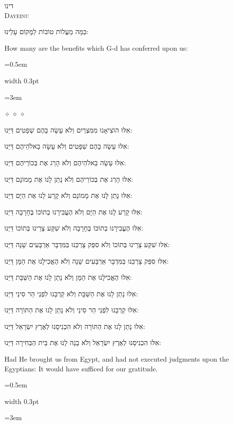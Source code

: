 \documentclass[11pt, openany]{book}
\newlength{\bidiHebWidth}
\newlength{\bidiEngWidth}
\newenvironment{bilingual}{%
  \par\vspace{4pt}%
}{%
  \noindent
  \begin{minipage}[t]{\bidiEngWidth}
    \setstretch{1.4}\emergencystretch=0.5em\normalsize
    \usebox{\bidiEngBox}
  \end{minipage}%
  \hfill
  {\color{sedergold}\vrule width 0.3pt}%
  \hfill
  \begin{minipage}[t]{\bidiHebWidth}
    \begingroup\hebrewfont\TeXXeTstate=1\beginR
    \large\setstretch{1.4}\emergencystretch=3em\tolerance=9999\parindent=0pt\relax
    \usebox{\bidiHebBox}
    \endR\endgroup
  \end{minipage}%
  \par\vspace{2pt}%
}
\newenvironment{hebrewcol}{%
  \begin{lrbox}{\bidiHebBox}\begin{minipage}{\bidiHebWidth}%
}{%
  \end{minipage}\end{lrbox}%
}
\newenvironment{englishcol}{%
  \begin{lrbox}{\bidiEngBox}\begin{minipage}{\bidiEngWidth}%
}{%
  \end{minipage}\end{lrbox}%
}
\newcommand{\parasep}{%
  \par\vspace{3pt}
  \begin{center}
    \textcolor{sedergold!50}{\tiny$\diamond\;\diamond\;\diamond$}
  \end{center}
  \par\vspace{3pt}
}
\newcommand{\subsedertitle}[2]{%
  \par\vspace{8pt}
  \begin{center}
    {\hebrewfontlarge\TeXXeTstate=1\beginR\textcolor{sederblue}{#1}\endR}\\[3pt]
    {\normalsize\scshape\textcolor{sederblue}{#2}}
  \end{center}
  \par\vspace{3pt}
}
\begin{document}
\subsedertitle{דינו}{Dayeinu}


\begin{bilingual}
\begin{hebrewcol}
כַּמָּה מַעֲלוֹת טוֹבוֹת לַמָּקוֹם עָלֵינוּ:
\end{hebrewcol}
\begin{englishcol}
How many are the benefits which G-d has conferred upon us:
\end{englishcol}
\end{bilingual}
\parasep

\begin{bilingual}
\begin{hebrewcol}
אִלּוּ הוֹצִיאָנוּ מִמִּצְרַיִם וְלֹא עָשָׂה בָהֶם שְׁפָטִים דַּיֵּנוּ:

אִלּוּ עָשָׂה בָהֶם שְׁפָטִים וְלֹא עָשָׂה בֵאלֹהֵיהֶם דַּיֵּנוּ:

אִלּוּ עָשָׂה בֵאלֹהֵיהֶם וְלֹא הָרַג אֶת בְּכוֹרֵיהֶם דַּיֵּנוּ:

אִלּוּ הָרַג אֶת בְּכוֹרֵיהֶם וְלֹא נָתַן לָנוּ אֶת מָמוֹנָם דַּיֵּנוּ:

אִלּוּ נָתַן לָנוּ אֶת מָמוֹנָם וְלֹא קָרַע לָנוּ אֶת הַיָּם דַּיֵּנוּ:

אִלּוּ קָרַע לָנוּ אֶת הַיָּם וְלֹא הֶעֱבִירָנוּ בְתוֹכוֹ בֶּחָרָבָה דַּיֵּנוּ:

אִלּוּ הֶעֱבִירָנוּ בְתוֹכוֹ בֶּחָרָבָה וְלֹא שִׁקַּע צָרֵינוּ בְּתוֹכוֹ דַּיֵּנוּ:

אִלּוּ שִׁקַּע צָרֵינוּ בְּתוֹכוֹ וְלֹא סִפֵּק צָרְכֵּנוּ בַּמִּדְבָּר אַרְבָּעִים שָׁנָה			 דַּיֵּנוּ:

אִלּוּ סִפֵּק צָרְכֵּנוּ בַּמִּדְבָּר אַרְבָּעִים שָׁנָה וְלֹא הֶאֱכִילָנוּ אֶת הַמָּן			 דַּיֵּנוּ:

אִלּוּ הֶאֱכִילָנוּ אֶת הַמָּן וְלֹא נָתַן לָנוּ אֶת הַשַּׁבָּת דַּיֵּנוּ:

אִלּוּ נָתַן לָנוּ אֶת הַשַּׁבָּת וְלֹא קֵרְבָנוּ לִפְנֵי הַר סִינַי דַּיֵּנוּ:

אִלּוּ קֵרְבָנוּ לִפְנֵי הַר סִינַי וְלֹא נָתַן לָנוּ אֶת הַתּוֹרָה דַּיֵּנוּ:

אִלּוּ נָתַן לָנוּ אֶת הַתּוֹרָה וְלֹא הִכְנִיסָנוּ לְאֶרֶץ יִשְׂרָאֵל דַּיֵּנוּ:

אִלּוּ הִכְנִיסָנוּ לְאֶרֶץ יִשְׂרָאֵל וְלֹא בָנָה לָנוּ אֶת בֵּית הַבְּחִירָה			 דַּיֵּנוּ:
\end{hebrewcol}
\begin{englishcol}
Had He brought us from Egypt, and had not executed judgments upon the Egyptians: It would have sufficed for our gratitude.


\end{englishcol}
\end{bilingual}
\end{document}
